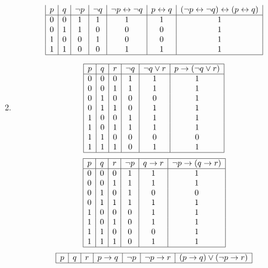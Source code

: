 \documentclass[12pt]{article}
\newcommand{\enumset}[1]{\setcounter{enumi}{#1}}
\newcommand{\lrarr}{\leftrightarrow}
\begin{document}
\begin{enumerate}
\begin{tasks}
\[\begin{array}{|*{7}{c|}}
									p & q & \lnot p & \lnot q & \lnot p \lrarr \lnot q & p \lrarr q & (\lnot p \lrarr \lnot q) \lrarr (p \lrarr q) \\\hline
									0 & 0 & 1 & 1 & 1 & 1 & 1 \\
									0 & 1 & 1 & 0 & 0 & 0 & 1 \\
									1 & 0 & 0 & 1 & 0 & 0 & 1 \\
									1 & 1 & 0 & 0 & 1 & 1 & 1 \\\hline
								\end{array}\]
						\end{tasks}
					\enumset{38}
					\item
						\begin{tasks}
							\task
								\[\begin{array}{|*{6}{c|}}\hline
									p & q & r & \lnot q & \lnot q \lor r & p \to (\lnot q \lor r) \\\hline
									0 & 0 & 0 & 1 & 1 & 1 \\
									0 & 0 & 1 & 1 & 1 & 1 \\
									0 & 1 & 0 & 0 & 0 & 1 \\
									0 & 1 & 1 & 0 & 1 & 1 \\
									1 & 0 & 0 & 1 & 1 & 1 \\
									1 & 0 & 1 & 1 & 1 & 1 \\
									1 & 1 & 0 & 0 & 0 & 0 \\
									1 & 1 & 1 & 0 & 1 & 1 \\\hline
								\end{array}\]
							\task
								\[\begin{array}{|*{6}{c|}}\hline
									p & q & r & \lnot p & q \to r & \lnot p \to (q \to r) \\\hline
									0 & 0 & 0 & 1 & 1 & 1 \\
									0 & 0 & 1 & 1 & 1 & 1 \\
									0 & 1 & 0 & 1 & 0 & 0 \\
									0 & 1 & 1 & 1 & 1 & 1 \\
									1 & 0 & 0 & 0 & 1 & 1 \\
									1 & 0 & 1 & 0 & 1 & 1 \\
									1 & 1 & 0 & 0 & 0 & 1 \\
									1 & 1 & 1 & 0 & 1 & 1 \\\hline
								\end{array}\]
							\task
								\[\begin{array}{|*{7}{c|}}\hline
									p & q & r & p \to q & \lnot p & \lnot p \to r & (p \to q) \lor (\lnot p \to r) \\\hline

\end{array}\]
\end{tasks}
\end{enumerate}
\end{document}
